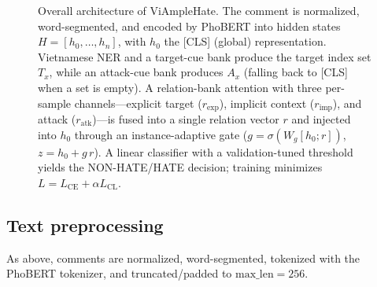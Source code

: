 \documentclass[11pt]{article}
\begin{document}
\begin{figure}[!t]
{%
  }
  \caption{Overall architecture of ViAmpleHate. The comment is normalized, word-segmented, and encoded by PhoBERT into hidden states $H=[h_0,\dots,h_n]$, with $h_0$ the [CLS] (global) representation. Vietnamese NER and a target-cue bank produce the target index set $T_x$, while an attack-cue bank produces $A_x$ (falling back to [CLS] when a set is empty). A relation-bank attention with three per-sample channels---explicit target ($r_{\mathrm{exp}}$), implicit context ($r_{\mathrm{imp}}$), and attack ($r_{\mathrm{atk}}$)---is fused into a single relation vector $r$ and injected into $h_0$ through an instance-adaptive gate ($g=\sigma(W_g[h_0;r])$, $z=h_0+g\,r$). A linear classifier with a validation-tuned threshold yields the NON-HATE/HATE decision; training minimizes $L=L_{\mathrm{CE}}+\alpha L_{\mathrm{CL}}$.}
  \label{fig:arch}
\end{figure}

\subsection{Text preprocessing}
As above, comments are normalized, word-segmented, tokenized with the PhoBERT tokenizer, and truncated/padded to $\mathrm{max\_len}=256$.
\end{document}
